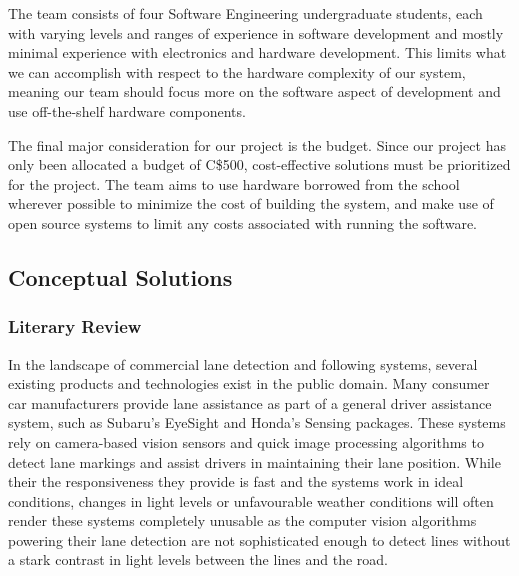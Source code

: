 \documentclass[titlepage,draft]{article}
\begin{document}
The team consists of four Software Engineering undergraduate students, each with varying levels and ranges of experience in software development and mostly minimal experience with electronics and hardware development. This limits what we can accomplish with respect to the hardware complexity of our system, meaning our team should focus more on the software aspect of development and use off-the-shelf hardware components.

The final major consideration for our project is the budget. Since our project has only been allocated a budget of C\$500, cost-effective solutions must be prioritized for the project. The team aims to use hardware borrowed from the school wherever possible to minimize the cost of building the system, and make use of open source systems to limit any costs associated with running the software.

\subsection{Conceptual Solutions}

\subsubsection{Literary Review}

In the landscape of commercial lane detection and following systems, several existing products and technologies exist in the public domain. Many consumer car manufacturers provide lane assistance as part of a general driver assistance system, such as Subaru's EyeSight\cite{subaru_eyesight} and Honda's Sensing \cite{honda_sensing} packages. These systems rely on camera-based vision sensors and quick image processing algorithms to detect lane markings and assist drivers in maintaining their lane position. While their the responsiveness they provide is fast and the systems work in ideal conditions, changes in light levels or unfavourable weather conditions will often render these systems completely unusable as the computer vision algorithms powering their lane detection are not sophisticated enough to detect lines without a stark contrast in light levels between the lines and the road.
\end{document}
